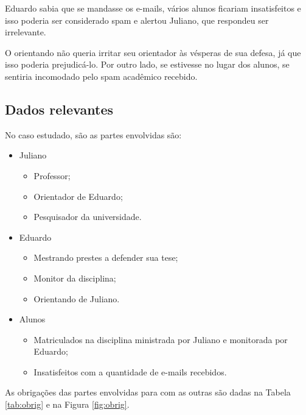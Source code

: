 \documentclass[a4paper,dvipdfm]{article}
\begin{document}
	Eduardo sabia que se mandasse os e-mails, vários alunos ficariam insatisfeitos e isso poderia ser considerado spam e alertou Juliano, que respondeu ser irrelevante.

	O orientando não queria irritar seu orientador às vésperas de sua defesa, já que isso poderia prejudicá-lo. 
	Por outro lado, se estivesse no lugar dos alunos, se sentiria incomodado pelo spam acadêmico recebido.

\newpage
	\subsection{Dados relevantes}
		No caso estudado, são as partes envolvidas são:
		\begin{itemize}
			\item Juliano
				\begin{itemize}
					\item Professor;
					\item Orientador de Eduardo;
					\item Pesquisador da universidade.
				\end{itemize}
			\item Eduardo
				\begin{itemize}
					\item Mestrando prestes a defender sua tese;
					\item Monitor da disciplina;
					\item Orientando de Juliano.
				\end{itemize} 
			\item Alunos
				\begin{itemize}
					\item Matriculados na disciplina ministrada por Juliano e monitorada por Eduardo;
					\item Insatisfeitos com a quantidade de e-mails recebidos. 
				\end{itemize}
		\end{itemize}

		As obrigações das partes envolvidas para com as outras são dadas na Tabela \ref{tab:obrig} e na Figura \ref{fig:obrig}.
\end{document}
